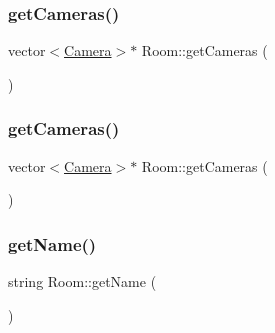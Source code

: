 \mbox{\label{class_room_a4a67443ce377dda8f71d862428a31ef1}} 
\subsubsection{\texorpdfstring{get\+Cameras()}{getCameras()}\hspace{0.1cm}{\footnotesize\ttfamily [1/2]}}
{\footnotesize\ttfamily vector$<$\hyperlink{struct_camera}{Camera}$>$$\ast$ Room\+::get\+Cameras (\begin{DoxyParamCaption}{ }\end{DoxyParamCaption})\hspace{0.3cm}{\ttfamily [inline]}}

\mbox{\label{class_room_a4a67443ce377dda8f71d862428a31ef1}} 
\subsubsection{\texorpdfstring{get\+Cameras()}{getCameras()}\hspace{0.1cm}{\footnotesize\ttfamily [2/2]}}
{\footnotesize\ttfamily vector$<$\hyperlink{struct_camera}{Camera}$>$$\ast$ Room\+::get\+Cameras (\begin{DoxyParamCaption}{ }\end{DoxyParamCaption})\hspace{0.3cm}{\ttfamily [inline]}}

\mbox{\label{class_room_a5701522ecf180c978eaa454d79f3e305}} 
\subsubsection{\texorpdfstring{get\+Name()}{getName()}\hspace{0.1cm}{\footnotesize\ttfamily [1/2]}}
{\footnotesize\ttfamily string Room\+::get\+Name (\begin{DoxyParamCaption}{ }\end{DoxyParamCaption})\hspace{0.3cm}{\ttfamily [inline]}}

\mbox{\label{class_room_a5701522ecf180c978eaa454d79f3e305}} 
